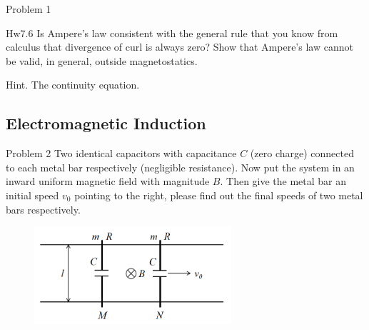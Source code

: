 \documentclass{beamer}
\begin{document}
\begin{frame}{Problem 1}
\end{frame}

\begin{frame}{Hw7.6}
Is Ampere’s law consistent with the general rule that you know from calculus that divergence of curl is always zero? Show that Ampere’s law cannot be valid, in general, outside magnetostatics.

Hint. The continuity equation.

\end{frame}

\subsection{Electromagnetic Induction}

\begin{frame}{Problem 2}
    Two identical capacitors with capacitance $C$ (zero charge) connected to each metal bar respectively (negligible resistance). Now put the system in an inward uniform magnetic field with magnitude $B$. Then give the metal bar an initial speed $v_{0}$ pointing to the right, please find out the final speeds of two metal bars respectively. 

\begin{figure}[H]
 \centering
 \includegraphics[width=0.65\textwidth]{images/010.png}
\end{figure}
    
\end{frame}
\end{document}
